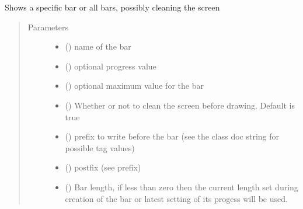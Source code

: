 \documentclass[a4paper,10pt,english]{sphinxmanual}
\begin{document}
\begin{fulllineitems}

\begin{fulllineitems}
\label{\detokenize{api/termtools.terminal.ProgressBarController:termtools.terminal.ProgressBarController.show_all}}
Shows a specific bar or all bars, possibly cleaning the screen
\begin{quote}\begin{description}
\item[{Parameters}] \leavevmode\begin{itemize}
\item {} 
 () \textendash{} name of the bar

\item {} 
 () \textendash{} optional progress value

\item {} 
 () \textendash{} optional maximum value for the bar

\item {} 
 () \textendash{} Whether or not to clean the screen before drawing. Default is true

\item {} 
 () \textendash{} prefix to write before the bar (see the class doc string for possible tag values)

\item {} 
 () \textendash{} postfix (see prefix)

\item {} 
 () \textendash{} Bar length, if less than zero then the current length set during creation of the bar or latest setting of its progess will be used.


\end{itemize}
\end{description}
\end{quote}
\end{fulllineitems}
\end{fulllineitems}
\end{document}
